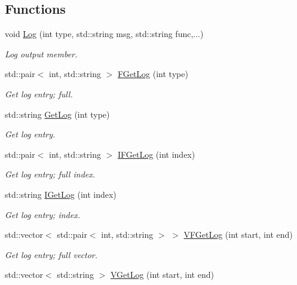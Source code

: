 \subsection*{Functions}
\begin{DoxyCompactItemize}
\item 
void \hyperlink{namespacepessum_ae1c31460fcd571df95b03ff82c890e4b}{Log} (int type, std\+::string msg, std\+::string func,...)
\begin{DoxyCompactList}\small\item\em Log output member. \end{DoxyCompactList}\item 
std\+::pair$<$ int, std\+::string $>$ \hyperlink{namespacepessum_ae7c3a2695cc96dc4f826e252d5dd4398}{F\+Get\+Log} (int type)
\begin{DoxyCompactList}\small\item\em Get log entry; full. \end{DoxyCompactList}\item 
std\+::string \hyperlink{namespacepessum_aa7ccd36394acb961bdd887f32b3572e1}{Get\+Log} (int type)
\begin{DoxyCompactList}\small\item\em Get log entry. \end{DoxyCompactList}\item 
std\+::pair$<$ int, std\+::string $>$ \hyperlink{namespacepessum_a92df65a763df879d6902d5c5c600f1d4}{I\+F\+Get\+Log} (int index)
\begin{DoxyCompactList}\small\item\em Get log entry; full index. \end{DoxyCompactList}\item 
std\+::string \hyperlink{namespacepessum_aeb38d643b26d768565f5a2c89b103f83}{I\+Get\+Log} (int index)
\begin{DoxyCompactList}\small\item\em Get log entry; index. \end{DoxyCompactList}\item 
std\+::vector$<$ std\+::pair$<$ int, std\+::string $>$ $>$ \hyperlink{namespacepessum_a32367e906bdf84c0942a5e4a3588b255}{V\+F\+Get\+Log} (int start, int end)
\begin{DoxyCompactList}\small\item\em Get log entry; full vector. \end{DoxyCompactList}\item 
std\+::vector$<$ std\+::string $>$ \hyperlink{namespacepessum_a82047101ac6c52e881b2817c487038ff}{V\+Get\+Log} (int start, int end)

\end{DoxyCompactItemize}
